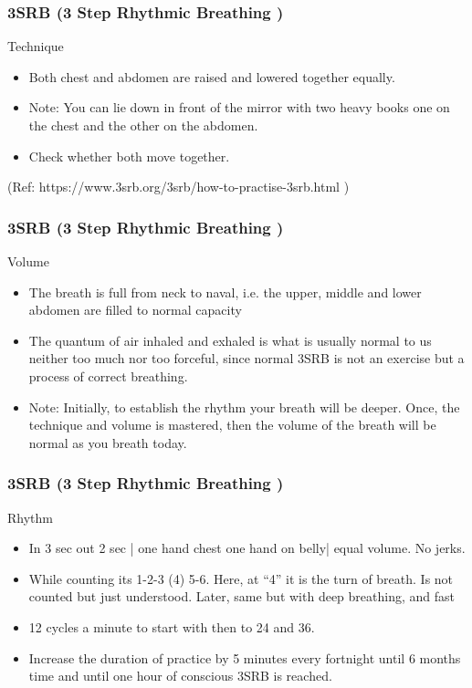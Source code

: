 \begin{frame}[fragile]
\frametitle{3SRB (3 Step Rhythmic Breathing )}

Technique

\begin{itemize}
\item Both chest and abdomen are raised and lowered together equally.
\item Note: You can lie down in front of the mirror with two heavy books one on the chest and the other on the abdomen. 
\item Check whether both move together.
\end{itemize}

\tiny{(Ref: https://www.3srb.org/3srb/how-to-practise-3srb.html )}
\end{frame}

\begin{frame}[fragile]
\frametitle{3SRB (3 Step Rhythmic Breathing )}

Volume

\begin{itemize}
\item The breath is full from neck to naval, i.e. the upper, middle and lower abdomen are filled to normal capacity
\item The quantum of air inhaled and exhaled is what is usually normal to us neither too much nor too forceful, since normal 3SRB is not an exercise but a process of correct breathing. 
\item Note: Initially, to establish the rhythm your breath will be deeper. Once, the technique and volume is mastered, then the volume of the breath will be normal as you breath today.
\end{itemize}
\end{frame}


\begin{frame}[fragile]
\frametitle{3SRB (3 Step Rhythmic Breathing )}

Rhythm

\begin{itemize}
\item In 3 sec out 2 sec | one hand chest one hand on belly| equal volume. No jerks. 
\item  While counting its 1-2-3 (4) 5-6. Here, at ``4'' it is the turn of breath. Is not counted but just understood. Later, same but with deep breathing, and fast
\item 12 cycles a minute to start with then to 24 and 36.
\item  Increase the duration of practice by 5 minutes every fortnight until 6 months time and until one hour of conscious 3SRB is reached.
\end{itemize}
\end{frame}


